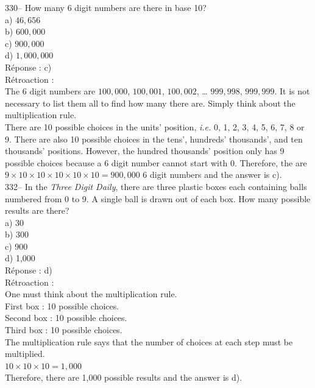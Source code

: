 \documentclass[letterpaper, 12pt]{article}
\begin{document}
330-- How many 6 digit numbers are there in base 10?\\

a) $46,656$\\
b) $600,000$\\
c) $900,000$\\
d) $1,000,000$\\

R\'eponse : c)\\

R\'etroaction : \\
The 6 digit numbers are $100,000$,  $100,001$, $100,002$, \ldots
  $999,998$,  $999,999$. It is not necessary to list them all to find how many there are. Simply think about the multiplication rule.\\
There are 10 possible choices in the units' position, \emph{i.e.} 0,
1, 2, 3, 4, 5, 6, 7, 8 or 9. There are also 10 possible choices in
the tens', hundreds' thousands', and ten thousands' positions.
However, the hundred thousands' position only has 9 possible choices because a 6 digit number cannot start with 0. Therefore, the are $9\times10\times10\times10\times10\times10=900,000$ 6 digit numbers and the answer is c).\\


332-- In the \emph{Three Digit Daily}, there are three plastic boxes
each containing balls numbered from 0 to 9. A single ball is drawn
out of each box.
How many possible results are there?\\

a) 30\\
b) 300\\
c) 900\\
d) 1,000\\

R\'eponse : d)\\

R\'etroaction : \\
One must think about the multiplication rule.\\
First box : 10 possible choices.\\
Second box : 10 possible choices.\\
Third box : 10 possible choices.\\
The multiplication rule says that the number of choices at each step must be multiplied.\\
$10\times10\times10=1,000$\\
Therefore, there are 1,000 possible results and the answer is d).\\
\end{document}
